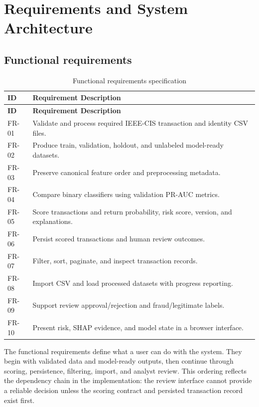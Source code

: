 \chapter{Requirements and System Architecture}
\label{chap:architecture}

\section{Functional requirements}

\begin{longtable}{p{}p{}}
\caption{Functional requirements specification}
\label{tab:functional-requirements}\\
\toprule
\textbf{ID} & \textbf{Requirement Description}\\
\midrule
\endfirsthead
\toprule
\textbf{ID} & \textbf{Requirement Description}\\
\midrule
\endhead
FR-01 & Validate and process required IEEE-CIS transaction and identity CSV files.\\
FR-02 & Produce train, validation, holdout, and unlabeled model-ready datasets.\\
FR-03 & Preserve canonical feature order and preprocessing metadata.\\
FR-04 & Compare binary classifiers using validation PR-AUC metrics.\\
FR-05 & Score transactions and return probability, risk score, version, and explanations.\\
FR-06 & Persist scored transactions and human review outcomes.\\
FR-07 & Filter, sort, paginate, and inspect transaction records.\\
FR-08 & Import CSV and load processed datasets with progress reporting.\\
FR-09 & Support review approval/rejection and fraud/legitimate labels.\\
FR-10 & Present risk, SHAP evidence, and model state in a browser interface.\\
\bottomrule
\end{longtable}

The functional requirements define what a user can do with the system. They
begin with validated data and model-ready outputs, then continue through
scoring, persistence, filtering, import, and analyst review. This ordering
reflects the dependency chain in the implementation: the review interface
cannot provide a reliable decision unless the scoring contract and persisted
transaction record exist first.

